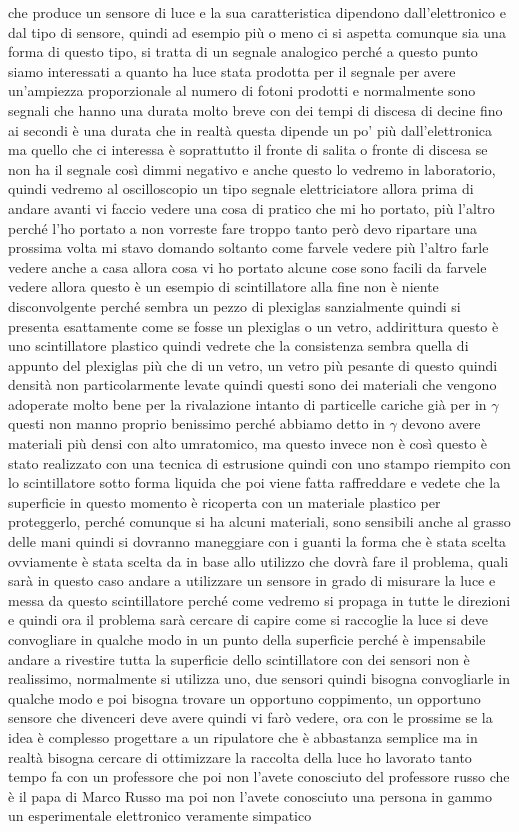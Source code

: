 {che produce un sensore di luce e la sua caratteristica dipendono dall'elettronico e dal tipo di sensore, quindi ad esempio più o meno ci si aspetta comunque sia una forma di questo tipo, si tratta di un segnale analogico perché a questo punto siamo interessati a quanto ha luce stata prodotta per il segnale per avere un'ampiezza proporzionale al numero di fotoni prodotti e normalmente sono segnali che hanno una durata molto breve con dei tempi di discesa di decine fino ai secondi è una durata che in realtà questa dipende un po' più dall'elettronica ma quello che ci interessa è soprattutto il fronte di salita o fronte di discesa se non ha il segnale così dimmi negativo e anche questo lo vedremo in laboratorio, quindi vedremo al oscilloscopio un tipo segnale elettriciatore allora prima di andare avanti vi faccio vedere una cosa di pratico che mi ho portato, più l'altro perché l'ho portato a non vorreste fare troppo tanto però devo ripartare una prossima volta mi stavo domando soltanto come farvele vedere più l'altro farle vedere anche a casa allora cosa vi ho portato alcune cose sono facili da farvele vedere allora questo è un esempio di scintillatore alla fine non è niente disconvolgente perché sembra un pezzo di plexiglas sanzialmente quindi si presenta esattamente come se fosse un plexiglas o un vetro, addirittura questo è uno scintillatore plastico quindi vedrete che la consistenza sembra quella di appunto del plexiglas più che di un vetro, un vetro più pesante di questo quindi densità non particolarmente levate quindi questi sono dei materiali che vengono adoperate molto bene per la rivalazione intanto di particelle cariche già per in $\gamma$ questi non manno proprio benissimo perché abbiamo detto in $\gamma$ devono avere materiali più densi con alto umratomico, ma questo invece non è così questo è stato realizzato con una tecnica di estrusione quindi con uno stampo riempito con lo scintillatore sotto forma liquida che poi viene fatta raffreddare e vedete che la superficie in questo momento è ricoperta con un materiale plastico per proteggerlo, perché comunque si ha alcuni materiali, sono sensibili anche al grasso delle mani quindi si dovranno maneggiare con i guanti la forma che è stata scelta ovviamente è stata scelta da in base allo utilizzo che dovrà fare il problema, quali sarà in questo caso andare a utilizzare un sensore in grado di misurare la luce e messa da questo scintillatore perché come vedremo si propaga in tutte le direzioni e quindi ora il problema sarà cercare di capire come si raccoglie la luce si deve convogliare in qualche modo in un punto della superficie perché è impensabile andare a rivestire tutta la superficie dello scintillatore con dei sensori non è realissimo, normalmente si utilizza uno, due sensori quindi bisogna convogliarle in qualche modo e poi bisogna trovare un opportuno coppimento, un opportuno sensore che divenceri deve avere quindi vi farò vedere, ora con le prossime se la idea è complesso progettare a un ripulatore che è abbastanza semplice ma in realtà bisogna cercare di ottimizzare la raccolta della luce ho lavorato tanto tempo fa con un professore che poi non l'avete conosciuto del professore russo che è il papa di Marco Russo ma poi non l'avete conosciuto una persona in gammo un esperimentale elettronico veramente simpatico }
